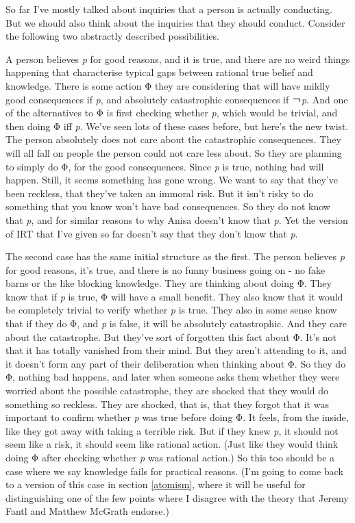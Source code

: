 \documentclass[
  11pt,
]{book}
\begin{document}
So far I've mostly talked about inquiries that a person is actually conducting. But we should also think about the inquiries that they should conduct. Consider the following two abstractly described possibilities.

A person believes \emph{p} for good reasons, and it is true, and there are no weird things happening that characterise typical gaps between rational true belief and knowledge. There is some action Φ they are considering that will have mildly good consequences if \emph{p}, and absolutely catastrophic consequences if ￢\emph{p}. And one of the alternatives to Φ is first checking whether \emph{p}, which would be trivial, and then doing Φ iff \emph{p}. We've seen lots of these cases before, but here's the new twist. The person absolutely does not care about the catastrophic consequences. They will all fall on people the person could not care less about. So they are planning to simply do Φ, for the good consequences. Since \emph{p} is true, nothing bad will happen. Still, it seems something has gone wrong. We want to say that they've been reckless, that they've taken an immoral risk. But it isn't risky to do something that you know won't have bad consequences. So they do not know that \emph{p}, and for similar reasons to why Anisa doesn't know that \emph{p}. Yet the version of IRT that I've given so far doesn't say that they don't know that \emph{p}.

The second case has the same initial structure as the first. The person believes \emph{p} for good reasons, it's true, and there is no funny business going on - no fake barns or the like blocking knowledge. They are thinking about doing Φ. They know that if \emph{p} is true, Φ will have a small benefit. They also know that it would be completely trivial to verify whether \emph{p} is true. They also in some sense know that if they do Φ, and \emph{p} is false, it will be absolutely catastrophic. And they care about the catastrophe. But they've sort of forgotten this fact about Φ. It's not that it has totally vanished from their mind. But they aren't attending to it, and it doesn't form any part of their deliberation when thinking about Φ. So they do Φ, nothing bad happens, and later when someone asks them whether they were worried about the possible catastrophe, they are shocked that they would do something so reckless. They are shocked, that is, that they forgot that it was important to confirm whether \emph{p} was true before doing Φ. It feels, from the inside, like they got away with taking a terrible risk. But if they knew \emph{p}, it should not seem like a risk, it should seem like rational action. (Just like they would think doing Φ after checking whether \emph{p} was rational action.) So this too should be a case where we say knowledge fails for practical reasons. (I'm going to come back to a version of this case in section \ref{atomism}, where it will be useful for distinguishing one of the few points where I disagree with the theory that Jeremy Fantl and Matthew McGrath \citep{FantlMcGrath2002, FantlMcGrath2009} endorse.)
\end{document}
